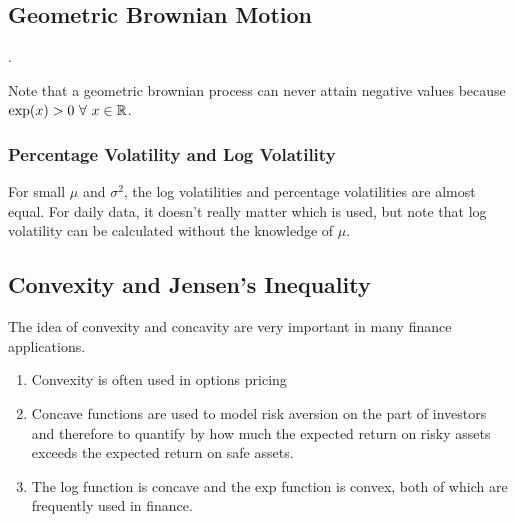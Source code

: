 \documentclass[12pt]{scrartcl}
\begin{document}
\subsection{Geometric Brownian Motion}

.

\begin{note} Note that a geometric brownian process can never attain negative values because $\exp(x) > 0 \ \forall \ x \in \mathbb R$.
\end{note}

\subsubsection{Percentage Volatility and Log Volatility}


\begin{note}
    For small $\mu$ and $\sigma^2$, the log volatilities and percentage volatilities are almost equal. For daily data, it doesn't really matter which is used, but note that log volatility can be calculated without the knowledge of $\mu$. 
\end{note}

\subsection{Convexity and Jensen's Inequality}




The idea of convexity and concavity are very important in many finance applications.
\begin{enumerate}
    \item Convexity is often used in options pricing
    \item Concave functions are used to model risk aversion on the part of investors and therefore to quantify by how much the expected return on risky assets exceeds the expected return on safe assets.
    \item The log function is concave and the exp function is convex, both of which are frequently used in finance.
\end{enumerate}
\end{document}
